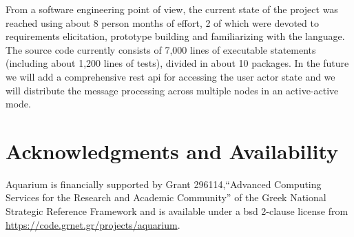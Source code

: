 \documentclass[letterpaper,twocolumn,10pt]{article}
\begin{document}
From a software engineering point of view, the current state of the
project was reached using about 8 person months of effort, 2 of which
were devoted to requirements elicitation, prototype building and
familiarizing with the language. The source code currently consists of
7,000 lines of executable statements (including about 1,200 lines of
tests), divided in about 10 packages. In the future we will add a
comprehensive {\sc rest api} for accessing the user actor state and we
will distribute the message processing across multiple nodes in an
active-active mode.

\section{Acknowledgments and Availability}

Aquarium is financially supported by Grant 296114,``Advanced Computing
Services for the Research and Academic Community'' of the Greek
National Strategic Reference Framework and is available under a {\sc
  bsd} 2-clause license from
\url{https://code.grnet.gr/projects/aquarium}.

{\footnotesize 
}
\end{document}
